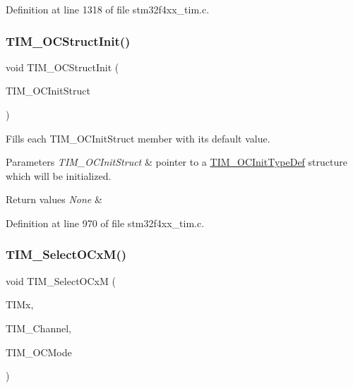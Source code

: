 Definition at line 1318 of file stm32f4xx\+\_\+tim.\+c.

\mbox{\label{group___t_i_m___group2_ga394683c78ae02837882e36014e11643e}} 
\subsubsection{\texorpdfstring{T\+I\+M\+\_\+\+O\+C\+Struct\+Init()}{TIM\_OCStructInit()}}
{\footnotesize\ttfamily void T\+I\+M\+\_\+\+O\+C\+Struct\+Init (\begin{DoxyParamCaption}\item[{\hyperlink{struct_t_i_m___o_c_init_type_def}{T\+I\+M\+\_\+\+O\+C\+Init\+Type\+Def} $\ast$}]{T\+I\+M\+\_\+\+O\+C\+Init\+Struct }\end{DoxyParamCaption})}



Fills each T\+I\+M\+\_\+\+O\+C\+Init\+Struct member with its default value. 


\begin{DoxyParams}{Parameters}
{\em T\+I\+M\+\_\+\+O\+C\+Init\+Struct} & pointer to a \hyperlink{struct_t_i_m___o_c_init_type_def}{T\+I\+M\+\_\+\+O\+C\+Init\+Type\+Def} structure which will be initialized. \\
\hline
\end{DoxyParams}

\begin{DoxyRetVals}{Return values}
{\em None} & \\
\hline
\end{DoxyRetVals}


Definition at line 970 of file stm32f4xx\+\_\+tim.\+c.

\mbox{\label{group___t_i_m___group2_ga83ea0af5a7c1af521236ce5e4d2c42b0}} 
\subsubsection{\texorpdfstring{T\+I\+M\+\_\+\+Select\+O\+Cx\+M()}{TIM\_SelectOCxM()}}
{\footnotesize\ttfamily void T\+I\+M\+\_\+\+Select\+O\+CxM (\begin{DoxyParamCaption}\item[{\hyperlink{struct_t_i_m___type_def}{T\+I\+M\+\_\+\+Type\+Def} $\ast$}]{T\+I\+Mx,  }\item[{uint16\+\_\+t}]{T\+I\+M\+\_\+\+Channel,  }\item[{uint16\+\_\+t}]{T\+I\+M\+\_\+\+O\+C\+Mode }\end{DoxyParamCaption})}



